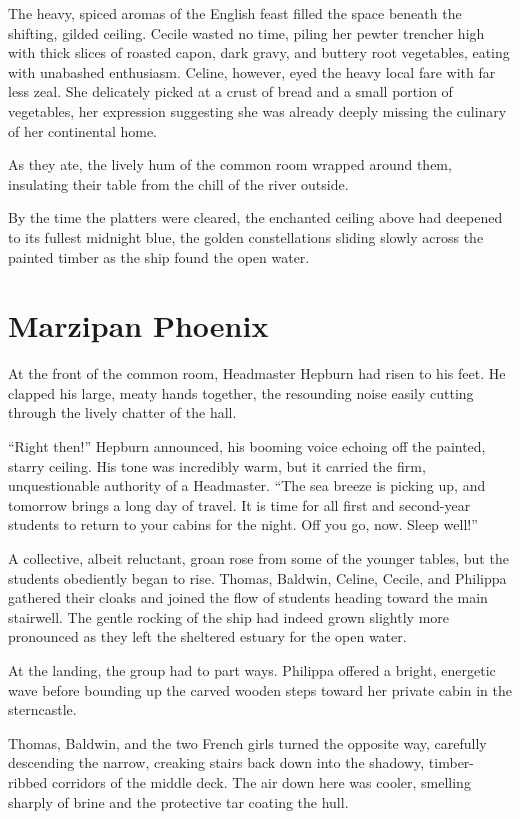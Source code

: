 The heavy, spiced aromas of the English feast filled the space beneath the shifting, gilded ceiling. Cecile wasted no time, piling her pewter trencher high with thick slices of roasted capon, dark gravy, and buttery root vegetables, eating with unabashed enthusiasm. Celine, however, eyed the heavy local fare with far less zeal. She delicately picked at a crust of bread and a small portion of vegetables, her expression suggesting she was already deeply missing the culinary of her continental home.

As they ate, the lively hum of the common room wrapped around them, insulating their table from the chill of the river outside.

By the time the platters were cleared, the enchanted ceiling above had deepened to its fullest midnight blue, the golden constellations sliding slowly across the painted timber as the ship found the open water.


\section*{Marzipan Phoenix}

At the front of the common room, Headmaster Hepburn had risen to his feet. He clapped his large, meaty hands together, the resounding noise easily cutting through the lively chatter of the hall.

\enquote{Right then!} Hepburn announced, his booming voice echoing off the painted, starry ceiling. His tone was incredibly warm, but it carried the firm, unquestionable authority of a Headmaster. \enquote{The sea breeze is picking up, and tomorrow brings a long day of travel. It is time for all first and second-year students to return to your cabins for the night. Off you go, now. Sleep well!}

A collective, albeit reluctant, groan rose from some of the younger tables, but the students obediently began to rise. Thomas, Baldwin, Celine, Cecile, and Philippa gathered their cloaks and joined the flow of students heading toward the main stairwell. The gentle rocking of the ship had indeed grown slightly more pronounced as they left the sheltered estuary for the open water.

At the landing, the group had to part ways. Philippa offered a bright, energetic wave before bounding up the carved wooden steps toward her private cabin in the sterncastle.

Thomas, Baldwin, and the two French girls turned the opposite way, carefully descending the narrow, creaking stairs back down into the shadowy, timber-ribbed corridors of the middle deck. The air down here was cooler, smelling sharply of brine and the protective tar coating the hull.

